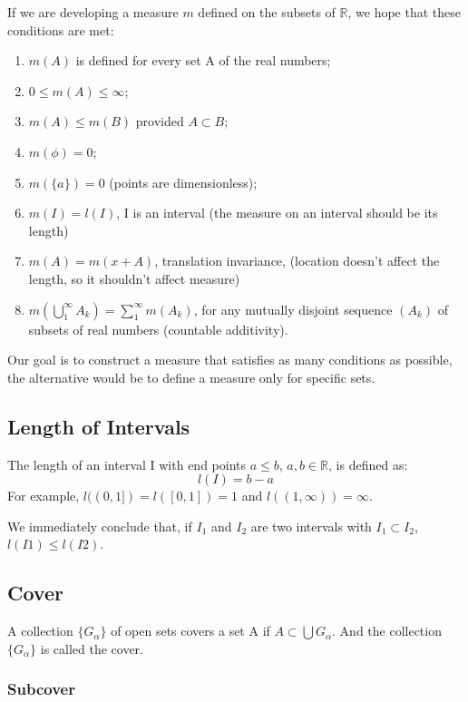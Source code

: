 \documentclass{article}
\begin{document}
 If we are developing a measure $m$ defined on the subsets of $\mathbb{R}$, we hope that these conditions are met:
 \begin{enumerate}
     \item $m(A)$ is defined for every set A of the real numbers;
     \item $0\leq m(A) \leq \infty$;
     \item $m(A) \leq m(B)$ provided $A \subset B$;
     \item $m(\phi) =0 $;
     \item $m(\{a\})=0$ (points are dimensionless);
     \item $m(I)=l(I)$, I is an interval (the measure on an interval should be its length)
     \item $m(A)=m(x+A)$, translation invariance, (location doesn't affect the length, so it shouldn't affect measure)
     \item $m(\bigcup_{1}^{\infty} {A_k}) = \sum_{1}^{\infty}m(A_k)$, for any mutually disjoint sequence $(A_k)$ of subsets of real numbers (countable additivity).
 \end{enumerate}
 Our goal is to construct a measure that satisfies as many conditions as possible, the alternative would be to define a measure only for specific sets.
 
 \subsection{Length of Intervals}
 
 The length of an interval I with end points $a\leq b$, $a,b \in \mathbb{R}$, is defined as:
 $$l(I) = b-a$$
 For example, $l((0,1])=l([0,1])=1$ and $l((1,\infty))=\infty$.
 
 We immediately conclude that, if $I_1$ and $I_2$ are two intervals with $I_1 \subset I_2$, $l(I1) \leq l(I2)$.
 
 \subsection{Cover}
 
 A collection $\{G_{\alpha}\}$ of open sets covers a set A if $A \subset \bigcup G_{\alpha}$. And the collection $\{G_{\alpha}\}$ is called the cover.
 
 \subsubsection{Subcover}
 
\end{document}
